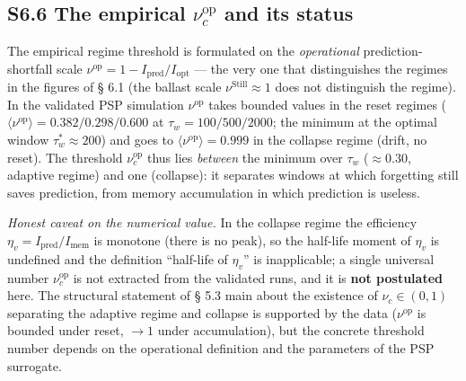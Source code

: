 \documentclass[pdflatex,sn-mathphys-ay]{sn-jnl}
\begin{document}
\subsection*{\texorpdfstring{S6.6 The empirical \(\nu_c^{\text{op}}\) and its status}{S6.6 The empirical \textbackslash nu\_c\^{}\{\textbackslash text\{op\}\} and its status}}\label{s6.6-the-empirical-nu_ctextop-and-its-status}



The empirical regime threshold is formulated on the \emph{operational} prediction-shortfall scale \(\nu^{\text{op}} = 1 - I_{\text{pred}}/I_{\text{opt}}\) --- the very one that distinguishes the regimes in the figures of § 6.1 (the ballast scale \(\nu^{\text{Still}} \approx 1\) does not distinguish the regime). In the validated PSP simulation \(\nu^{\text{op}}\) takes bounded values in the reset regimes (\(\langle\nu^{\text{op}}\rangle = 0.382 / 0.298 / 0.600\) at \(\tau_w = 100 / 500 / 2000\); the minimum at the optimal window \(\tau_w^* \approx 200\)) and goes to \(\langle\nu^{\text{op}}\rangle = 0.999\) in the collapse regime (drift, no reset). The threshold \(\nu_c^{\text{op}}\) thus lies \emph{between} the minimum over \(\tau_w\) (\(\approx 0.30\), adaptive regime) and one (collapse): it separates windows at which forgetting still saves prediction, from memory accumulation in which prediction is useless.



\emph{Honest caveat on the numerical value.} In the collapse regime the efficiency \(\eta_v = I_{\text{pred}}/I_{\text{mem}}\) is monotone (there is no peak), so the half-life moment of \(\eta_v\) is undefined and the definition ``half-life of \(\eta_v\)'' is inapplicable; a single universal number \(\nu_c^{\text{op}}\) is not extracted from the validated runs, and it is \textbf{not postulated} here. The structural statement of § 5.3 main about the existence of \(\nu_c \in (0,1)\) separating the adaptive regime and collapse is supported by the data (\(\nu^{\text{op}}\) is bounded under reset, \(\to 1\) under accumulation), but the concrete threshold number depends on the operational definition and the parameters of the PSP surrogate.
\end{document}
